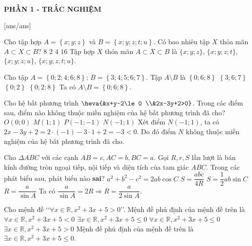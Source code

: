 
\begin{center}
	\textbf{PHẦN 1 - TRẮC NGHIỆM}
\end{center}
[ans/ans]
\begin{ex}%
	Cho tập hợp $A=\left\{x;y;z\right\}$ và $B=\left\{x;y;z;t;u\right\}$. Có bao nhiêu tập $X$ thỏa mãn $A\subset X\subset B$?
	\choice
	{$8$}
	{$2$}
	{\True $4$}
	{$16$}
	\loigiai
	{
		Tập hợp $X$ thỏa mãn $A\subset X\subset B$ là $\{x;y;z\}$, $\{x;y;z;t\}$, $\{x;y;z;u\}$, $\{x;y;z;t;u\}$.
	}
\end{ex}
\begin{ex}%
	Cho tập $A=\left\{0;2;4;6;8\right\}$; $B=\left\{3;4;5;6;7\right\}$. Tập $A\setminus B$ là
	\choice
	{\True $\left\{0;6;8\right\}$}
	{$\left\{3;6;7\right\}$}
	{$\left\{0;2\right\}$}
	{$\left\{0;2;8\right\}$}
	\loigiai
	{
		Ta có $A\setminus B=\left\{0;6;8\right\}$.
	}
\end{ex}
\begin{ex}%
	Cho hệ bất phương trình $\heva{&x+y-2\le 0 \\&2x-3y+2>0}$. Trong các điểm sau, điểm nào không thuộc miền nghiệm của hệ bất phương trình đã cho?
	\choice
	{$O\left(0;0\right)$}
	{$M\left(1;1\right)$}
	{$P\left(-1;-1\right)$}
	{\True $N\left(-1;1\right)$}
	\loigiai
	{
		Xét điểm $N(-1;1)$, ta có $2x-3y+2=2\cdot(-1)-3\cdot 1+2=-3<0$. Do đó điểm $N$ không thuộc miền nghiệm của hệ bất phương trình đã cho.
	}
\end{ex}
\begin{ex}%
	Cho $\Delta ABC$ với các cạnh $AB=c,AC=b,BC=a$. Gọi $R,r,S$ lần lượt là bán kính đường tròn ngoại tiếp, nội tiếp và diện tích của tam giác $ABC$. Trong các phát biểu sau, phát biểu nào \textbf{sai}?
	\choice
	{$a^2+b^2-c^2=2ab\cos C$}
	{$S=\dfrac{abc}{4R}$}
	{$S=\dfrac{1}{2}ab\sin C$}
	{\True $R=\dfrac{a}{\sin A}$}
	\loigiai
	{
		Ta có $\dfrac{a}{\sin A}=2R\Rightarrow R=\dfrac{a}{2\sin A}$.
	}
\end{ex}
\begin{ex}%
	Cho mệnh đề \lq\lq $\forall x\in \mathbb{R},x^2+3x+5>0$\rq\rq. Mệnh đề phủ định của mệnh đề trên là
	\choice
	{$\forall x\in \mathbb{R},x^2+3x+5<0$}
	{\True $\exists x\in \mathbb{R},x^2+3x+5\le 0$}
	{$\forall x\in \mathbb{R},x^2+3x+5\le 0$}
	{$\exists x\in \mathbb{R},x^2+3x+5>0$}
	\loigiai
	{
		Mệnh đề phủ định của mệnh đề trên là $\exists x\in \mathbb{R},x^2+3x+5\le 0$.
	}
\end{ex}
